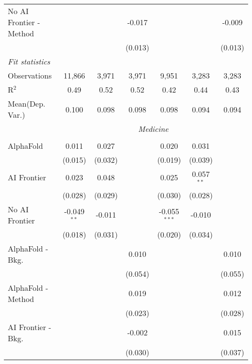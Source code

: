 \begin{tabular}{lcccccc}
   No AI Frontier - Method &               &              & -0.017       &               &              & -0.009\\   
                           &               &              & (0.013)      &               &              & (0.013)\\   
   \midrule
   \emph{Fit statistics}\\
   Observations            & 11,866        & 3,971        & 3,971        & 9,951         & 3,283        & 3,283\\  
   R$^2$                   & 0.49          & 0.52         & 0.52         & 0.42          & 0.44         & 0.43\\  
   
Mean(Dep. Var.) & 0.100 & 0.098 & 0.098 & 0.098 & 0.094 & 0.094 \\
 & \multicolumn{6}{c}{\textit{Medicine}} \\ \\
   AlphaFold               & 0.011         & 0.027   &         & 0.020          & 0.031        &   \\   
                           & (0.015)       & (0.032) &         & (0.019)        & (0.039)      &   \\   
   AI Frontier             & 0.023         & 0.048   &         & 0.025          & 0.057$^{**}$ &   \\   
                           & (0.028)       & (0.029) &         & (0.030)        & (0.028)      &   \\   
   No AI Frontier          & -0.049$^{**}$ & -0.011  &         & -0.055$^{***}$ & -0.010       &   \\   
                           & (0.018)       & (0.031) &         & (0.020)        & (0.034)      &   \\   
   AlphaFold - Bkg.        &               &         & 0.010   &                &              & 0.010\\   
                           &               &         & (0.054) &                &              & (0.055)\\   
   AlphaFold - Method      &               &         & 0.019   &                &              & 0.012\\   
                           &               &         & (0.023) &                &              & (0.028)\\   
   AI Frontier - Bkg.      &               &         & -0.002  &                &              & 0.015\\   
                           &               &         & (0.030) &                &              & (0.037)\\   

\end{tabular}
